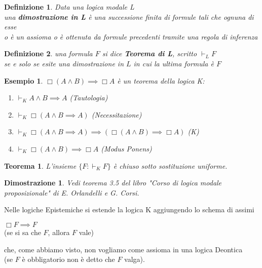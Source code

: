 \documentclass[a4paper,12pt]{article}
\theoremstyle{def}
\newtheorem*{definition}{Definizione}
\theoremstyle{prop}
\theoremstyle{esempio}
\newtheorem*{example}{Esempio}
\theoremstyle{dimostrazione}
\newtheorem*{dimostrazione}{Dimostrazione}
\theoremstyle{teo}
\newtheorem*{teorema}{Teorema}
\theoremstyle{osservazione}
\begin{document}
\begin{definition}
	Data una logica modale L\\
	una \textbf{dimostrazione in L} è una successione finita di formule tali che ognuna di esse\\
	o è un assioma o è ottenuta da formule precedenti tramite una regola di inferenza
\end{definition}
\begin{definition}
	una formula \(F\) si dice \textbf{Teorema di L}, scritto \textbf{\(\vdash_L F\)}\\
	se e solo se esite una dimostrazione in \(L\) in cui la ultima formula è \(F\)
\end{definition}
\begin{example}
	\(\Box (A \land B) \implies \Box A\) è un teorema della logica K:
	\begin{enumerate}
		\item \(\vdash_K A \land B \implies A\) (Tautologia)
		\item \(\vdash_K \Box (A \land B \implies A)\) (Necessitazione)
		\item \(\vdash_K \Box (A \land B \implies A ) \implies (\Box (A \land B ) \implies \Box A)\) (K)
		\item \(\vdash_K \Box (A \land B ) \implies \Box A\) (Modus Ponens)
	\end{enumerate}
\end{example}
\begin{teorema}
	L'insieme \(\{F : \vdash_K F\}\) è chiuso sotto sostituzione uniforme.\\
\end{teorema}
\begin{dimostrazione}
	Vedi teorema 3.5 del libro \textit{"Corso di logica modale proposizionale"} di E. Orlandelli e G. Corsi.
\end{dimostrazione}
\newpage
Nelle logiche Epistemiche si estende la logica K aggiungendo lo schema di assimi
\begin{center}
	\(\Box F \implies F\)\\
	(se si sa che \(F\), allora \(F\) vale)
\end{center}
che, come abbiamo visto, non vogliamo come assioma in una logica Deontica\\
(se \(F\) è obbligatorio non è detto che \(F\) valga).
\end{document}
